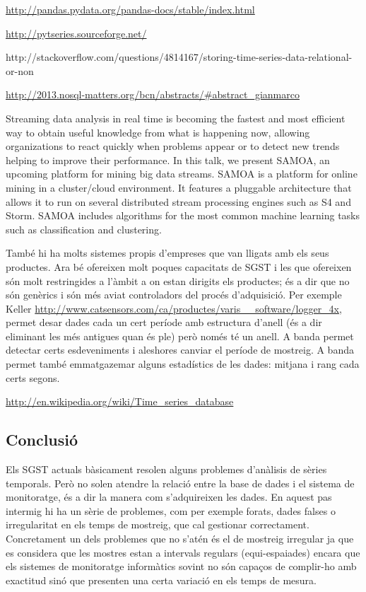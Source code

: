 \url{http://pandas.pydata.org/pandas-docs/stable/index.html}

\url{http://pytseries.sourceforge.net/}



http://stackoverflow.com/questions/4814167/storing-time-series-data-relational-or-non



\url{http://2013.nosql-matters.org/bcn/abstracts/#abstract_gianmarco}

Streaming data analysis in real time is becoming the fastest and most efficient way to obtain useful knowledge from what is happening now, allowing organizations to react quickly when problems appear or to detect new trends helping to improve their performance. In this talk, we present SAMOA, an upcoming platform for mining big data streams. SAMOA is a platform for online mining in a cluster/cloud environment. It features a pluggable architecture that allows it to run on several distributed stream processing engines such as S4 and Storm. SAMOA includes algorithms for the most common machine learning tasks such as classification and clustering. 






\todo{} També hi ha molts sistemes propis d'empreses que van lligats
amb els seus productes. Ara bé ofereixen molt poques capacitats de
SGST i les que ofereixen són molt restringides a l'àmbit a on estan
dirigits els productes; és a dir que no són genèrics i són més aviat
controladors del procés d'adquisició. Per exemple Keller
\url{http://www.catsensors.com/ca/productes/varis__software/logger_4x}, permet desar dades cada un cert període amb estructura d'anell (és a dir eliminant les més antigues quan és ple) però només té un anell. A banda permet detectar certs esdeveniments i aleshores canviar el període de mostreig. A banda permet també emmatgazemar alguns estadístics de les dades: mitjana i rang cada certs segons.

\url{http://en.wikipedia.org/wiki/Time_series_database}



\subsection{Conclusió}

Els SGST actuals bàsicament resolen alguns problemes d'anàlisis de sèries temporals.
Però no solen atendre la relació entre la base de dades i el sistema de monitoratge, és a dir la manera com s'adquireixen les dades. En aquest pas intermig hi ha un sèrie de problemes, com per exemple forats, dades falses o irregularitat en els temps de mostreig, que cal gestionar correctament. Concretament un dels problemes que no s'atén és el de mostreig irregular ja que es considera que les mostres estan a intervals regulars (equi-espaiades) encara que els sistemes de monitoratge informàtics sovint no són capaços de complir-ho amb exactitud sinó que presenten una certa variació en els temps de mesura. 

